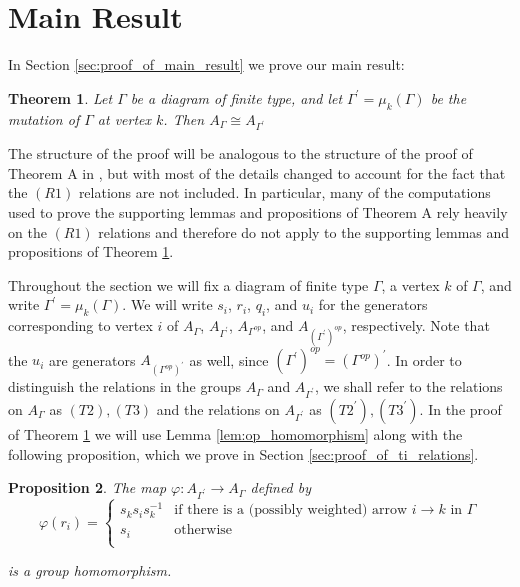 \documentclass[11pt]{amsart}
\newtheorem{thm}{Theorem}[section]
\newtheorem{prop}[thm]{Proposition}
\theoremstyle{definition}
\begin{document}
\section{Main Result}\label{sec:main_result}
\noindent In Section \ref{sec:proof_of_main_result} we prove our main result:

\begin{thm}\label{thm:main}
Let $\Gamma$ be a diagram of finite type, and let $\Gamma^{\prime} = \mu_k(\Gamma)$ be the mutation of $\Gamma$ at vertex $k$. Then $A_{\Gamma} \cong A_{\Gamma^{\prime}}$
\end{thm}


The structure of the proof will be analogous to the structure of the proof of Theorem A in \cite{BM13}, but with most of the details changed to account for the fact that the $(R1)$ relations are not included.  In particular, many of the computations used to prove the supporting lemmas and propositions of Theorem A rely heavily on the $(R1)$ relations and therefore do not apply to the supporting lemmas and propositions of Theorem \ref{thm:main}.

Throughout the section we will fix a diagram of finite type $\Gamma$, a vertex $k$ of $\Gamma$, and write $\Gamma^{\prime} = \mu_k(\Gamma)$.  We will write $s_i$, $r_i$, $q_i$, and $u_i$ for the generators corresponding to vertex $i$ of $A_{\Gamma}$, $A_{\Gamma^\prime}$, $A_{\Gamma^{op}}$, and $A_{\left(\Gamma^\prime\right)^{op}}$, respectively. Note that the $u_i$ are generators $A_{\left(\Gamma^{op}\right)^\prime}$ as well, since $\left(\Gamma^\prime\right)^{op} = \left(\Gamma^{op}\right)^\prime$.  In order to distinguish the relations in the groups $A_{\Gamma}$ and $A_{\Gamma^{\prime}}$, we shall refer to the relations on $A_{\Gamma}$ as $(T2),(T3)$ and the relations on $A_{\Gamma^\prime}$ as $(T2^\prime),(T3^\prime).$ In the proof of Theorem \ref{thm:main} we will use Lemma \ref{lem:op_homomorphism} along with the following proposition, which we prove in Section \ref{sec:proof_of_ti_relations}.


\begin{prop}\label{prop:ti_relations}
The map $\varphi \colon A_{\Gamma^\prime}\rightarrow A_{\Gamma}$ defined by
\begin{displaymath}
\varphi(r_i) = \begin{cases} s_ks_is_k^{-1} & \mbox{if there is a (possibly weighted) arrow } i \rightarrow k \mbox{ in } \Gamma\\
s_i & \mbox{otherwise}\\
\end{cases}
\end{displaymath}

\noindent is a group homomorphism.
\end{prop}
\end{document}
